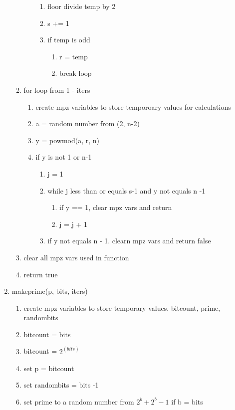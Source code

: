 \documentclass[11pt]{article}
\begin{document}
\begin{enumerate}
\begin{enumerate}
\begin{enumerate}
			\begin{enumerate}
			\item floor divide temp by 2
			\item s += 1
			\item if temp is odd
				\begin{enumerate}
				\item r = temp
				\item break loop
				\end{enumerate}
			\end{enumerate}
		\end{enumerate}
	\item for loop from 1 - iters
		\begin{enumerate}
		\item create mpz variables to store temporoary values for calculations
		\item a = random number from (2, n-2)
		\item y = powmod(a, r, n)
		\item if y is not 1 or n-1
			\begin{enumerate}
			\item j = 1
			\item while j less than or equals s-1 and  y not equals n -1
				\begin{enumerate}
				\item if y == 1, clear mpz vars and return
				\item j = j + 1
				\end{enumerate}
			\item if y not equals n - 1. clearn mpz vars and return false
			\end{enumerate}
		\end{enumerate}
	\item clear all mpz vars used in function
	\item return true
	\end{enumerate}
\item makeprime(p, bits, iters)
	\begin{enumerate}
	\item create mpz variables to store temporary values. bitcount, prime, randombits
	\item bitcount = bits
	\item bitcount = \(2^(bits)\)
	\item set p = bitcount
	\item set randombits = bits -1
	\item set prime to a random number from \(2^b + 2^b -1\) if b = bits

\end{enumerate}
\end{enumerate}
\end{document}
